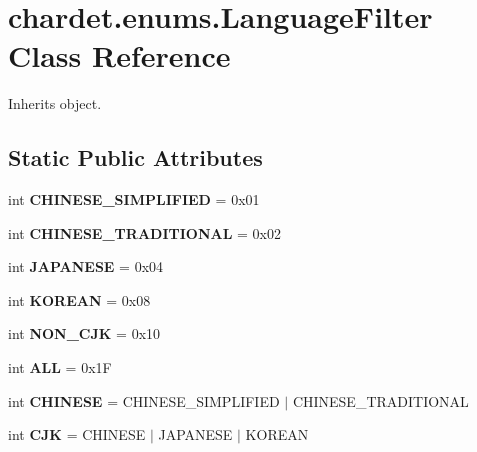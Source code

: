 \hypertarget{classchardet_1_1enums_1_1_language_filter}{}\section{chardet.\+enums.\+Language\+Filter Class Reference}
\label{classchardet_1_1enums_1_1_language_filter}


Inherits object.

\subsection*{Static Public Attributes}
\begin{DoxyCompactItemize}
\item 
\mbox{\label{classchardet_1_1enums_1_1_language_filter_ade6aae88e36d1e8c5c6d32f631f7c91f}} 
int {\bfseries C\+H\+I\+N\+E\+S\+E\+\_\+\+S\+I\+M\+P\+L\+I\+F\+I\+ED} = 0x01
\item 
\mbox{\label{classchardet_1_1enums_1_1_language_filter_a517b379b57ecf10d3b9b72b05157f8d5}} 
int {\bfseries C\+H\+I\+N\+E\+S\+E\+\_\+\+T\+R\+A\+D\+I\+T\+I\+O\+N\+AL} = 0x02
\item 
\mbox{\label{classchardet_1_1enums_1_1_language_filter_a6ca8c42dc06aa68e322ac17ad137565b}} 
int {\bfseries J\+A\+P\+A\+N\+E\+SE} = 0x04
\item 
\mbox{\label{classchardet_1_1enums_1_1_language_filter_a9772d418b5350aa3675a94bb923d6e8a}} 
int {\bfseries K\+O\+R\+E\+AN} = 0x08
\item 
\mbox{\label{classchardet_1_1enums_1_1_language_filter_a0e2145d66607943b0649278fe1a8d377}} 
int {\bfseries N\+O\+N\+\_\+\+C\+JK} = 0x10
\item 
\mbox{\label{classchardet_1_1enums_1_1_language_filter_ae11146c990d09b5e1033e3730950ad7d}} 
int {\bfseries A\+LL} = 0x1F
\item 
\mbox{\label{classchardet_1_1enums_1_1_language_filter_ad7f4c3cc296adde71784d1a0397d556f}} 
int {\bfseries C\+H\+I\+N\+E\+SE} = C\+H\+I\+N\+E\+S\+E\+\_\+\+S\+I\+M\+P\+L\+I\+F\+I\+ED $\vert$ C\+H\+I\+N\+E\+S\+E\+\_\+\+T\+R\+A\+D\+I\+T\+I\+O\+N\+AL
\item 
\mbox{\label{classchardet_1_1enums_1_1_language_filter_a5294d10e0628a2d1204b0780cb09eb56}} 
int {\bfseries C\+JK} = C\+H\+I\+N\+E\+SE $\vert$ J\+A\+P\+A\+N\+E\+SE $\vert$ K\+O\+R\+E\+AN
\end{DoxyCompactItemize}


